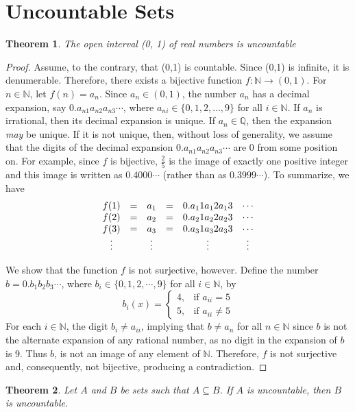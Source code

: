 \documentclass[10pt]{report}
\newtheorem{thm2}{Theorem}[section]
\begin{document}
\section{Uncountable Sets}
\begin{thm2}
The open interval (0, 1) of real numbers is uncountable
\end{thm2}
\begin{proof}
Assume, to the contrary, that (0,1) is countable. Since (0,1) is infinite, it is denumerable. Therefore, there exists a bijective function $f:\mathbb{N}\to (0,1)$. For $n\in\mathbb{N}$, let $f(n)=a_n$. Since $a_n\in (0,1)$, the number $a_n$ has a decimal expansion, say $0.a_{n1}a_{n2}a_{n3}\cdots$, where $a_{ni}\in \{0,1,2,\dots ,9\}$ for all $i\in\mathbb{N}$. If $a_n$ is irrational, then its decimal expansion is unique. If $a_n\in \mathbb{Q}$, then the expansion \textit{may} be unique. If it is not unique, then, without loss of generality, we assume that the digits of the decimal expansion $0.a_{n1}a_{n2}a_{n3}\cdots$ are 0 from some position on. For example, since $f$ is bijective, $\frac{2}{5}$ is the image of exactly one positive integer and this image is written as 0.4000$\cdots$ (rather than as $0.3999\cdots$). To summarize, we have
$$\begin{array}{c c c c c c}
f(1) & = & a_1 & = & 0.a_11a_12a_13 & \cdots\\
f(2) & = & a_2 & = & 0.a_21a_22a_23 & \cdots\\
f(3) & = & a_3 & = & 0.a_31a_32a_33 & \cdots\\
\vdots & & \vdots & & \vdots & \vdots
\end{array}$$

We show that the function $f$ is not surjective, however. Define the number $b=0.b_1b_2b_3\cdots$, where $b_i\in \{0,1,2,\cdots , 9\}$ for all $i\in \mathbb{N}$, by
$$b_i(x)=
\begin{cases}
4, & \text{if }a_{ii}=5 \\
5, & \text{if }a_{ii}\neq 5
\end{cases}$$
For each $i\in \mathbb{N}$, the digit $b_i\neq a_{ii}$, implying that $b\neq a_n$ for all $n\in\mathbb{N}$ since $b$ is not the alternate expansion of any rational number, as no digit in the expansion of $b$ is 9. Thus $b$, is not an image of any element of $\mathbb{N}$. Therefore, $f$ is not surjective and, consequently, not bijective, producing a contradiction.
\end{proof}
\begin{thm2}
Let $A$ and $B$ be sets such that $A\subseteq B$. If $A$ is uncountable, then $B$ is uncountable.
\end{thm2}
\end{document}
